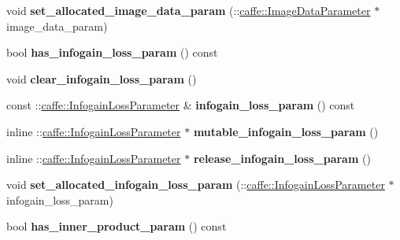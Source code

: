 \begin{DoxyCompactItemize}
void {\bfseries set\+\_\+allocated\+\_\+image\+\_\+data\+\_\+param} (\+::\mbox{\hyperlink{classcaffe_1_1_image_data_parameter}{caffe\+::\+Image\+Data\+Parameter}} $\ast$image\+\_\+data\+\_\+param)
\item 
\mbox{\label{classcaffe_1_1_layer_parameter_a90ec4b6413081ec6d3da9b27538ca4e6}} 
bool {\bfseries has\+\_\+infogain\+\_\+loss\+\_\+param} () const
\item 
\mbox{\label{classcaffe_1_1_layer_parameter_a6f4d3668e7d3a27f023b1db6bead2857}} 
void {\bfseries clear\+\_\+infogain\+\_\+loss\+\_\+param} ()
\item 
\mbox{\label{classcaffe_1_1_layer_parameter_a62d4a275f3ba066623096a6dfa49fd6f}} 
const \+::\mbox{\hyperlink{classcaffe_1_1_infogain_loss_parameter}{caffe\+::\+Infogain\+Loss\+Parameter}} \& {\bfseries infogain\+\_\+loss\+\_\+param} () const
\item 
\mbox{\label{classcaffe_1_1_layer_parameter_abbe57c40127dd28c75ccd2283e3b9646}} 
inline \+::\mbox{\hyperlink{classcaffe_1_1_infogain_loss_parameter}{caffe\+::\+Infogain\+Loss\+Parameter}} $\ast$ {\bfseries mutable\+\_\+infogain\+\_\+loss\+\_\+param} ()
\item 
\mbox{\label{classcaffe_1_1_layer_parameter_aed1377fcf2523712da70a5aec8749f2d}} 
inline \+::\mbox{\hyperlink{classcaffe_1_1_infogain_loss_parameter}{caffe\+::\+Infogain\+Loss\+Parameter}} $\ast$ {\bfseries release\+\_\+infogain\+\_\+loss\+\_\+param} ()
\item 
\mbox{\label{classcaffe_1_1_layer_parameter_a3a41098c2f0a0ccbbc25874ec059e7b4}} 
void {\bfseries set\+\_\+allocated\+\_\+infogain\+\_\+loss\+\_\+param} (\+::\mbox{\hyperlink{classcaffe_1_1_infogain_loss_parameter}{caffe\+::\+Infogain\+Loss\+Parameter}} $\ast$infogain\+\_\+loss\+\_\+param)
\item 
\mbox{\label{classcaffe_1_1_layer_parameter_afd16ff3d538afeb69bc2cdf119037c54}} 
bool {\bfseries has\+\_\+inner\+\_\+product\+\_\+param} () const
\item 
\mbox{\label{classcaffe_1_1_layer_parameter_adda21b1fdcc34902c31a4d1d5b27be33}} 

\end{DoxyCompactItemize}
